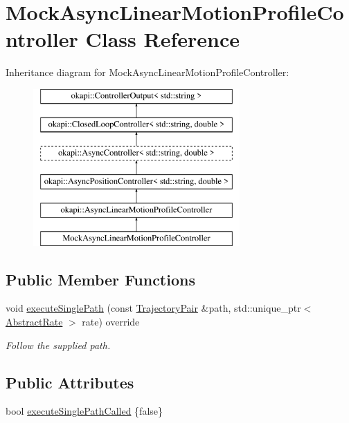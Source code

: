 \hypertarget{classMockAsyncLinearMotionProfileController}{}\section{Mock\+Async\+Linear\+Motion\+Profile\+Controller Class Reference}
\label{classMockAsyncLinearMotionProfileController}
Inheritance diagram for Mock\+Async\+Linear\+Motion\+Profile\+Controller\+:\begin{figure}[H]
\begin{center}
\leavevmode
\includegraphics[height=6.000000cm]{classMockAsyncLinearMotionProfileController}
\end{center}
\end{figure}
\subsection*{Public Member Functions}
\begin{DoxyCompactItemize}
\item 
void \mbox{\hyperlink{classMockAsyncLinearMotionProfileController_abc0b77c50deb4d0dc23c1d2122697689}{execute\+Single\+Path}} (const \mbox{\hyperlink{structokapi_1_1AsyncLinearMotionProfileController_1_1TrajectoryPair}{Trajectory\+Pair}} \&path, std\+::unique\+\_\+ptr$<$ \mbox{\hyperlink{classokapi_1_1AbstractRate}{Abstract\+Rate}} $>$ rate) override
\begin{DoxyCompactList}\small\item\em Follow the supplied path. \end{DoxyCompactList}\end{DoxyCompactItemize}
\subsection*{Public Attributes}
\begin{DoxyCompactItemize}
\item 
bool \mbox{\hyperlink{classMockAsyncLinearMotionProfileController_ad7b56b1f436e8ca244cb12d75f6b13b4}{execute\+Single\+Path\+Called}} \{false\}
\end{DoxyCompactItemize}
